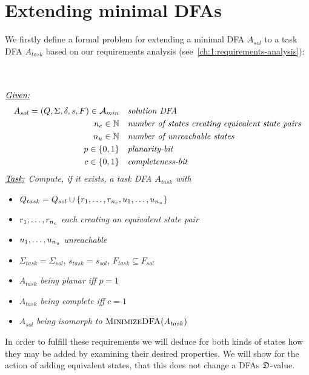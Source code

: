
\chapter{Extending minimal DFAs} \label{ch:4}

We firstly define a formal problem for extending a minimal DFA $A_{sol}$ to a task DFA $A_{task}$ based on our requirements analysis (see~\ref{ch:1:requirements-analysis}):
\begin{definition}[ExtendMinimalDFA] $ $ \\
	$ $ \vspace{-0.cm} \\
	\noindent $\underline{\emph{Given:}}$
	\vspace{-0.2cm}
	\begin{align*}
	A_{sol} = (Q, \Sigma, \delta, s, F) \in {\mathcal{A}_{min}}\ \ \ & \emph{solution DFA} \\
	{n_e} \in \mathbb{N}\ \ \ & \emph{number of states creating equivalent state pairs} \\
	{n_u} \in \mathbb{N}\ \ \ & \emph{number of unreachable states} \\
	p \in \{0,1\}\ \ \ & \emph{planarity-bit} \\
	c \in \{0,1\}\ \ \ & \emph{completeness-bit}
	\end{align*}
	\noindent $\underline{\emph{Task:}}$ \emph{Compute, if it exists, a task DFA $A_{task}$ with}
	\begin{itemize}
		\item $Q_{task} = Q_{sol} \cup \{ r_1, \ldots, r_{n_e}, u_1, \ldots, u_{n_u} \}$
		\item $r_1, \ldots, r_{n_e}$ \emph{each creating an equivalent state pair}
		\item $u_1, \ldots, u_{n_u}$ \emph{unreachable}
		\item $\Sigma_{task} = \Sigma_{sol}$, $s_{task} = s_{sol}$, $F_{task} \subseteq F_{sol}$
		\item $A_{task}$ \emph{being planar iff} $p = 1$
		\item $A_{task}$ \emph{being complete iff} $c = 1$
		\item $A_{sol}$ \emph{being isomorph to} $\textsc{MinimizeDFA}(A_{task})$
	\end{itemize}
\end{definition}
\noindent In order to fulfill these requirements we will deduce for both kinds of states how they may be added by examining their desired properties. We will show for the action of adding equivalent states, that this does not change a DFAs $\mathfrak{D}$-value.

